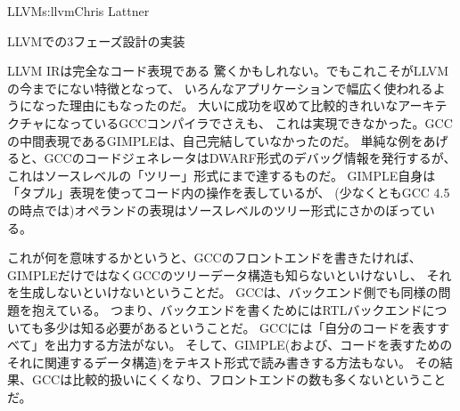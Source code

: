 \begin{aosachapter}{LLVM}{s:llvm}{Chris Lattner}
\begin{aosasect1}{LLVMでの3フェーズ設計の実装}
\begin{aosasect2}{LLVM IRは完全なコード表現である}
驚くかもしれない。でもこれこそがLLVMの今までにない特徴となって、
いろんなアプリケーションで幅広く使われるようになった理由にもなったのだ。
大いに成功を収めて比較的きれいなアーキテクチャになっているGCCコンパイラでさえも、
これは実現できなかった。GCCの中間表現であるGIMPLEは、自己完結していなかったのだ。
単純な例をあげると、GCCのコードジェネレータはDWARF形式のデバッグ情報を発行するが、
これはソースレベルの「ツリー」形式にまで達するものだ。
GIMPLE自身は「タプル」表現を使ってコード内の操作を表しているが、
(少なくともGCC 4.5の時点では)オペランドの表現はソースレベルのツリー形式にさかのぼっている。

これが何を意味するかというと、GCCのフロントエンドを書きたければ、
GIMPLEだけではなくGCCのツリーデータ構造も知らないといけないし、
それを生成しないといけないということだ。
GCCは、バックエンド側でも同様の問題を抱えている。
つまり、バックエンドを書くためにはRTLバックエンドについても多少は知る必要があるということだ。
GCCには「自分のコードを表すすべて」を出力する方法がない。
そして、GIMPLE(および、コードを表すためのそれに関連するデータ構造)をテキスト形式で読み書きする方法もない。
その結果、GCCは比較的扱いにくくなり、フロントエンドの数も多くないということだ。

\end{aosasect2}


\end{aosasect1}
\end{aosachapter}
